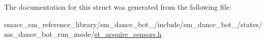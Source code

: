 The documentation for this struct was generated from the following file\+:\begin{DoxyCompactItemize}
\item 
smacc\+\_\+sm\+\_\+reference\+\_\+library/sm\+\_\+dance\+\_\+bot\+\_/include/sm\+\_\+dance\+\_\+bot\+\_/states/ms\+\_\+dance\+\_\+bot\+\_\+run\+\_\+mode/\hyperlink{sm__dance__bot__2_2include_2sm__dance__bot__2_2states_2ms__dance__bot__run__mode_2st__acquire__sensors_8h}{st\+\_\+acquire\+\_\+sensors.\+h}\end{DoxyCompactItemize}
